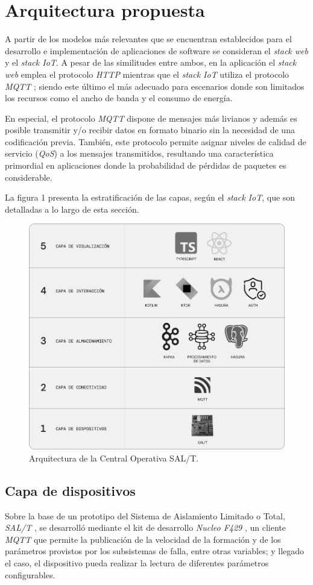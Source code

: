 
\section{Arquitectura propuesta}

A partir de los modelos más relevantes que se encuentran establecidos para el desarrollo e implementación de aplicaciones de software se consideran el \textit{stack web} y el \textit{stack IoT}. A pesar de las similitudes entre ambos, en la aplicación el \textit{stack web} emplea el protocolo \textit{HTTP} \cite{b5} mientras que el \textit{stack IoT} utiliza el protocolo \textit{MQTT} \cite{b6}; siendo este último el más adecuado para escenarios donde son limitados los recursos como el ancho de banda y el consumo de energía.

En especial, el protocolo \textit{MQTT} dispone de mensajes más livianos y además es posible transmitir y/o recibir datos en formato binario sin la necesidad de una codificación previa. También, este protocolo permite asignar niveles de calidad de servicio (\textit{QoS}) \cite{b7} a los mensajes transmitidos, resultando una característica primordial en aplicaciones donde la probabilidad de pérdidas de paquetes es considerable.

La figura 1 presenta la estratificación de las capas, según el \textit{stack IoT}, que son detalladas a lo largo de esta sección.

\begin{figure}[htp]
  \centering 
  \includegraphics[width=.48\textwidth]{images/v2.1.0/cuadro.png}
  \caption{Arquitectura de la Central Operativa SAL/T.}
  \label{fig:diagBloques}
\end{figure}

\subsection{Capa de dispositivos}

Sobre la base de un prototipo del Sistema de Aislamiento Limitado o Total, \textit{SAL/T} \cite{b1}, se desarrolló mediante el kit de desarrollo \textit{Nucleo F429} \cite{b8}, un cliente \textit{MQTT} que permite la publicación de la velocidad de la formación y de los parámetros provistos por los subsistemas de falla, entre otras variables; y llegado el caso, el dispositivo pueda realizar la lectura de diferentes parámetros configurables.

